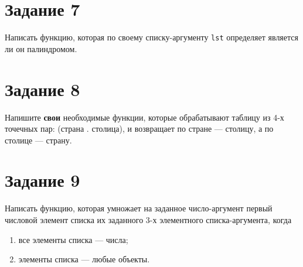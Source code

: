 \section{Задание 7}
Написать функцию, которая по своему списку-аргументу \texttt{lst} определяет является ли он палиндромом.

\section{Задание 8}
Напишите \textbf{свои} необходимые функции, которые обрабатывают таблицу из 4-х точечных пар: (страна . столица), и возвращает по стране --- столицу, а по столице --- страну.

\section{Задание 9}
Написать функцию, которая умножает на заданное число-аргумент первый числовой элемент списка их заданного 3-х элементного списка-аргумента, когда
\begin{enumerate}
	\item все элементы списка --- числа;
	\item элементы списка --- любые объекты.
\end{enumerate}

